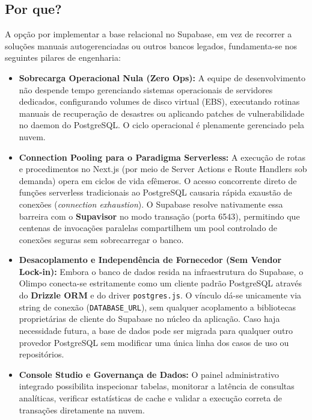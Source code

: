 \documentclass[12pt,a4paper]{article}
\begin{document}
\subsection{Por que?}
A opção por implementar a base relacional no Supabase, em vez de recorrer a soluções manuais autogerenciadas ou outros bancos legados, fundamenta-se nos seguintes pilares de engenharia:
\begin{itemize}
  \item \textbf{Sobrecarga Operacional Nula (Zero Ops):} A equipe de desenvolvimento não despende tempo gerenciando sistemas operacionais de servidores dedicados, configurando volumes de disco virtual (EBS), executando rotinas manuais de recuperação de desastres ou aplicando patches de vulnerabilidade no daemon do PostgreSQL. O ciclo operacional é plenamente gerenciado pela nuvem.
  \item \textbf{Connection Pooling para o Paradigma Serverless:} A execução de rotas e procedimentos no Next.js (por meio de Server Actions e Route Handlers sob demanda) opera em ciclos de vida efêmeros. O acesso concorrente direto de funções serverless tradicionais ao PostgreSQL causaria rápida exaustão de conexões (\textit{connection exhaustion}). O Supabase resolve nativamente essa barreira com o \textbf{Supavisor} no modo transação (porta 6543), permitindo que centenas de invocações paralelas compartilhem um pool controlado de conexões seguras sem sobrecarregar o banco.
  \item \textbf{Desacoplamento e Independência de Fornecedor (Sem Vendor Lock-in):} Embora o banco de dados resida na infraestrutura do Supabase, o Olimpo conecta-se estritamente como um cliente padrão PostgreSQL através do \textbf{Drizzle ORM} e do driver \texttt{postgres.js}. O vínculo dá-se unicamente via string de conexão (\texttt{DATABASE\_URL}), sem qualquer acoplamento a bibliotecas proprietárias de cliente do Supabase no núcleo da aplicação. Caso haja necessidade futura, a base de dados pode ser migrada para qualquer outro provedor PostgreSQL sem modificar uma única linha dos casos de uso ou repositórios.
  \item \textbf{Console Studio e Governança de Dados:} O painel administrativo integrado possibilita inspecionar tabelas, monitorar a latência de consultas analíticas, verificar estatísticas de cache e validar a execução correta de transações diretamente na nuvem.
\end{itemize}
\end{document}
